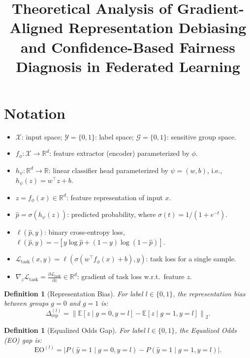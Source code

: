 \documentclass[11pt]{article}
\title{Theoretical Analysis of Gradient-Aligned Representation Debiasing and Confidence-Based Fairness Diagnosis in Federated Learning}
\author{}
\date{}
\newtheorem{definition}[theorem]{Definition}
\begin{document}
\maketitle

\section{Notation}

\begin{itemize}
    \item $\mathcal{X}$: input space; $\mathcal{Y} = \{0, 1\}$: label space; $\mathcal{G} = \{0, 1\}$: sensitive group space.
    \item $f_\phi: \mathcal{X} \to \mathbb{R}^d$: feature extractor (encoder) parameterized by $\phi$.
    \item $h_\psi: \mathbb{R}^d \to \mathbb{R}$: linear classifier head parameterized by $\psi = (w, b)$, i.e., $h_\psi(z) = w^\top z + b$.
    \item $z = f_\phi(x) \in \mathbb{R}^d$: feature representation of input $x$.
    \item $\hat{p} = \sigma(h_\psi(z))$: predicted probability, where $\sigma(t) = 1/(1+e^{-t})$.
    \item $\ell(\hat{p}, y)$: binary cross-entropy loss, $\ell(\hat{p}, y) = -[y \log \hat{p} + (1-y)\log(1-\hat{p})]$.
    \item $\mathcal{L}_{\text{task}}(x, y) = \ell(\sigma(w^\top f_\phi(x) + b), y)$: task loss for a single sample.
    \item $\nabla_z \mathcal{L}_{\text{task}} = \frac{\partial \mathcal{L}_{\text{task}}}{\partial z} \in \mathbb{R}^d$: gradient of task loss w.r.t.\ feature $z$.
\end{itemize}

\begin{definition}[Representation Bias]
    For label $l \in \{0, 1\}$, the representation bias between groups $g=0$ and $g=1$ is:
    \begin{equation}
        \Delta_{\mathrm{rep}}^{(l)} = \left\| \mathbb{E}[z \mid g=0, y=l] - \mathbb{E}[z \mid g=1, y=l] \right\|_2.
    \end{equation}
\end{definition}

\begin{definition}[Equalized Odds Gap]
    For label $l \in \{0, 1\}$, the Equalized Odds (EO) gap is:
    \begin{equation}
        \mathrm{EO}^{(l)} = \left| P(\hat{y}=1 \mid g=0, y=l) - P(\hat{y}=1 \mid g=1, y=l) \right|.
    \end{equation}
\end{definition}
\end{document}
